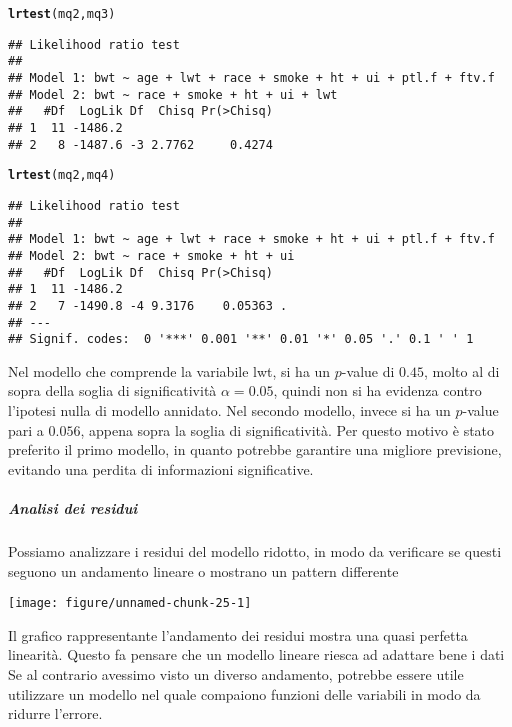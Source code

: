 \documentclass{article}\usepackage[]{graphicx}\usepackage[]{color}
\makeatletter
\def\maxwidth{ %
  \ifdim\Gin@nat@width>\linewidth
    \linewidth
  \else
    \Gin@nat@width
  \fi
}
\newcommand{\hlstd}[1]{\textcolor[rgb]{0.345,0.345,0.345}{#1}}%
\newcommand{\hlkwd}[1]{\textcolor[rgb]{0.737,0.353,0.396}{\textbf{#1}}}%
\newenvironment{kframe}{%
 \def\at@end@of@kframe{}%
 \ifinner\ifhmode%
  \def\at@end@of@kframe{\end{minipage}}%
  \begin{minipage}{\columnwidth}%
 \fi\fi%
 \def\FrameCommand##1{\hskip\@totalleftmargin \hskip-\fboxsep
 \colorbox{shadecolor}{##1}\hskip-\fboxsep
     \hskip-\linewidth \hskip-\@totalleftmargin \hskip\columnwidth}%
 \MakeFramed {\advance\hsize-\width
   \@totalleftmargin\z@ \linewidth\hsize
   \@setminipage}}%
 {\par\unskip\endMakeFramed%
 \at@end@of@kframe}
\newenvironment{knitrout}{}{} %
\makeatother
\begin{document}
\begin{knitrout}
\color{fgcolor}\begin{kframe}
\begin{alltt}
\hlkwd{lrtest}\hlstd{(mq2,mq3)}
\end{alltt}
\begin{verbatim}
## Likelihood ratio test
## 
## Model 1: bwt ~ age + lwt + race + smoke + ht + ui + ptl.f + ftv.f
## Model 2: bwt ~ race + smoke + ht + ui + lwt
##   #Df  LogLik Df  Chisq Pr(>Chisq)
## 1  11 -1486.2                     
## 2   8 -1487.6 -3 2.7762     0.4274
\end{verbatim}
\begin{alltt}
\hlkwd{lrtest}\hlstd{(mq2,mq4)}
\end{alltt}
\begin{verbatim}
## Likelihood ratio test
## 
## Model 1: bwt ~ age + lwt + race + smoke + ht + ui + ptl.f + ftv.f
## Model 2: bwt ~ race + smoke + ht + ui
##   #Df  LogLik Df  Chisq Pr(>Chisq)  
## 1  11 -1486.2                       
## 2   7 -1490.8 -4 9.3176    0.05363 .
## ---
## Signif. codes:  0 '***' 0.001 '**' 0.01 '*' 0.05 '.' 0.1 ' ' 1
\end{verbatim}
\end{kframe}
\end{knitrout}

Nel modello che comprende la variabile lwt, si ha un  $p$-value di $0.45$, molto al di sopra della soglia di significatività $\alpha = 0.05$, quindi non si ha evidenza contro l'ipotesi nulla di modello annidato.
Nel secondo modello, invece si ha un $p$-value pari a $0.056$, appena sopra la soglia di significatività.
Per questo motivo è stato preferito il primo modello, in quanto potrebbe garantire una migliore previsione, evitando una perdita di informazioni significative.

\subparagraph{Analisi dei residui}
Possiamo analizzare i residui del modello ridotto, in modo da verificare se questi seguono un andamento lineare o mostrano un pattern differente

\begin{knitrout}
\color{fgcolor}
\texttt{[image: figure/unnamed-chunk-25-1]} 
\end{knitrout}

Il grafico rappresentante l'andamento dei residui mostra una quasi perfetta linearità.
Questo fa pensare che un modello lineare riesca ad adattare bene i dati 
\\Se al contrario avessimo visto un diverso andamento, potrebbe essere utile utilizzare un modello nel quale compaiono funzioni delle variabili in modo da ridurre l'errore.
\end{document}
